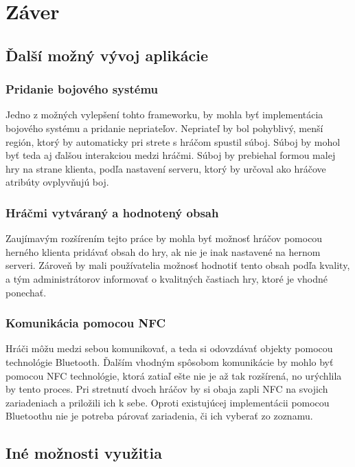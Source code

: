 \chapter{Záver}
\section{Ďalší možný vývoj aplikácie}
\subsection{Pridanie bojového systému}
Jedno z možných vylepšení tohto frameworku, by mohla byť implementácia bojového systému a pridanie nepriateľov. Nepriateľ by bol pohyblivý, menší región, ktorý by automaticky pri strete s hráčom spustil súboj. Súboj by mohol byť teda aj ďalšou interakciou medzi hráčmi. Súboj by prebiehal formou malej hry na strane klienta, podľa nastavení serveru, ktorý by určoval ako hráčove atribúty ovplyvňujú boj. 

\subsection{Hráčmi vytváraný a hodnotený obsah}
Zaujímavým rozšírením tejto práce by mohla byť možnosť hráčov pomocou herného klienta pridávať obsah do hry, ak nie je inak nastavené na hernom serveri. Zároveň by mali používatelia možnosť hodnotiť tento obsah podľa kvality, a tým administrátorov informovať o kvalitných častiach hry, ktoré je vhodné ponechať.

\subsection{Komunikácia pomocou NFC}
Hráči môžu medzi sebou komunikovať, a teda si odovzdávať objekty pomocou technológie Bluetooth. Ďalším vhodným spôsobom komunikácie by mohlo byť pomocou NFC technológie, ktorá zatiaľ ešte nie je až tak rozšírená, no urýchlila by tento proces. Pri stretnutí dvoch hráčov by si obaja zapli NFC na svojich zariadeniach a priložili ich k sebe. Oproti existujúcej implementácii pomocou Bluetoothu nie je potreba párovať zariadenia, či ich vyberať zo zoznamu. 

\section{Iné možnosti využitia}
